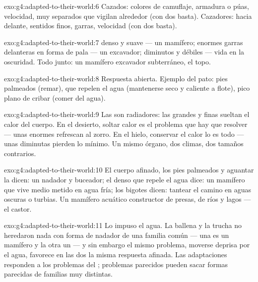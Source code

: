 \begin{solution}{exo:g4:adapted-to-their-world:6}
Cazados: colores de camuflaje, armadura o púas, velocidad,  muy
separados que vigilan alrededor (con dos basta). Cazadores:  hacia
delante, sentidos finos, garras, velocidad (con dos basta).
\end{solution}

\begin{solution}{exo:g4:adapted-to-their-world:7}
 denso y suave --- un mamífero; enormes garras delanteras en forma
de pala --- un excavador;  diminutos y débiles --- vida en la
oscuridad. Todo junto: un mamífero excavador subterráneo, el topo.
\end{solution}

\begin{solution}{exo:g4:adapted-to-their-world:8}
Respuesta abierta. Ejemplo del pato: pies palmeados (remar), 
que repelen el agua (mantenerse seco y caliente a flote), pico plano
de cribar (comer del agua).
\end{solution}

\begin{solution}{exo:g4:adapted-to-their-world:9}
Las  son radiadores: las grandes y finas sueltan el calor del
cuerpo. En el desierto, soltar calor es el problema que hay que
resolver --- unas  enormes refrescan al zorro. En el hielo,
conservar el calor lo es todo --- unas  diminutas pierden lo
mínimo. Un mismo órgano, dos climas, dos tamaños contrarios.
\end{solution}

\begin{solution}{exo:g4:adapted-to-their-world:10}
El cuerpo afinado, los pies palmeados y aguantar la  dicen:
un nadador y buceador; el  denso que repele el agua dice: un
mamífero que vive medio metido en agua fría; los bigotes dicen: tantear
el camino en aguas oscuras o turbias. Un mamífero acuático constructor
de presas, de ríos y lagos --- el castor.
\end{solution}

\begin{solution}{exo:g4:adapted-to-their-world:11}
Lo impuso el agua. La ballena y la trucha no heredaron nada con forma
de nadador de una familia común --- una es un mamífero y la otra un
 --- y sin embargo el mismo problema, moverse deprisa por el agua,
favorece en las dos la misma respuesta afinada. Las adaptaciones
responden a los problemas del ; problemas parecidos pueden
sacar formas parecidas de familias muy distintas.
\end{solution}
